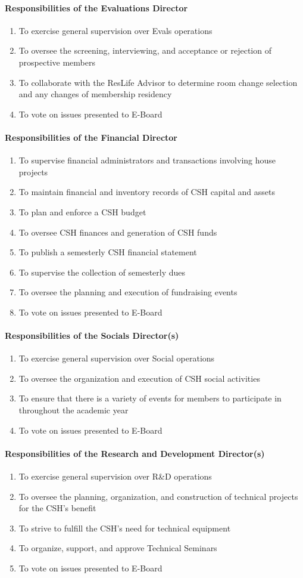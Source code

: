 \documentclass{article}
\newcommand{\asubsubsection}[1]{\paragraph{#1} \label{#1}}
\begin{document}
\asubsubsection{Responsibilities of the Evaluations Director}
\begin{enumerate}
	\item To exercise general supervision over Evals operations
	\item To oversee the screening, interviewing, and acceptance or rejection of prospective members
	\item To collaborate with the ResLife Advisor to determine room change selection and any changes of membership residency
	\item To vote on issues presented to E-Board
\end{enumerate}

\asubsubsection{Responsibilities of the Financial Director}
\begin{enumerate}
	\item To supervise financial administrators and transactions involving house projects
	\item To maintain financial and inventory records of CSH capital and assets
	\item To plan and enforce a CSH budget
	\item To oversee CSH finances and generation of CSH funds
	\item To publish a semesterly CSH financial statement
	\item To supervise the collection of semesterly dues
	\item To oversee the planning and execution of fundraising events
	\item To vote on issues presented to E-Board
\end{enumerate}

\asubsubsection{Responsibilities of the Socials Director(s)}
\begin{enumerate}
	\item To exercise general supervision over Social operations
	\item To oversee the organization and execution of CSH social activities
	\item To ensure that there is a variety of events for members to participate in throughout the academic year
	\item To vote on issues presented to E-Board
\end{enumerate}

\asubsubsection{Responsibilities of the Research and Development Director(s)}
\begin{enumerate}
	\item To exercise general supervision over R\&D operations
	\item To oversee the planning, organization, and construction of technical projects for the CSH's benefit
	\item To strive to fulfill the CSH's need for technical equipment
	\item To organize, support, and approve Technical Seminars
	\item To vote on issues presented to E-Board
\end{enumerate}
\end{document}
